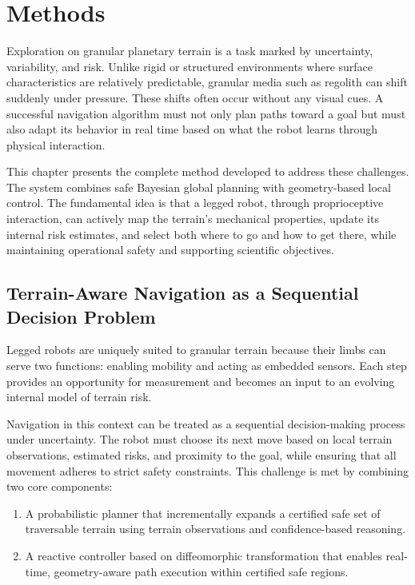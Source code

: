 \chapter{\leavevmode \newline Methods}
\label{chap:Methods}

Exploration on granular planetary terrain is a task marked by uncertainty, variability, and risk. Unlike rigid or structured environments where surface characteristics are relatively predictable, granular media such as regolith can shift suddenly under pressure. These shifts often occur without any visual cues. A successful navigation algorithm must not only plan paths toward a goal but must also adapt its behavior in real time based on what the robot learns through physical interaction.

This chapter presents the complete method developed to address these challenges. The system combines safe Bayesian global planning with geometry-based local control. The fundamental idea is that a legged robot, through proprioceptive interaction, can actively map the terrain's mechanical properties, update its internal risk estimates, and select both where to go and how to get there, while maintaining operational safety and supporting scientific objectives.

\section{Terrain-Aware Navigation as a Sequential Decision Problem}

Legged robots are uniquely suited to granular terrain because their limbs can serve two functions: enabling mobility and acting as embedded sensors. Each step provides an opportunity for measurement and becomes an input to an evolving internal model of terrain risk.

Navigation in this context can be treated as a sequential decision-making process under uncertainty. The robot must choose its next move based on local terrain observations, estimated risks, and proximity to the goal, while ensuring that all movement adheres to strict safety constraints. This challenge is met by combining two core components:

\begin{enumerate}
    \item A probabilistic planner that incrementally expands a certified safe set of traversable terrain using terrain observations and confidence-based reasoning.
    \item A reactive controller based on diffeomorphic transformation that enables real-time, geometry-aware path execution within certified safe regions.
\end{enumerate}

